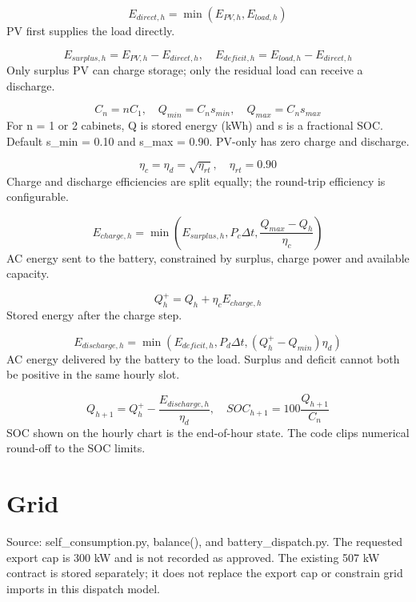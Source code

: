 \documentclass[10pt,a4paper]{article}
\begin{document}
\begin{equation}
E_{direct,h}=\min(E_{PV,h},E_{load,h})
\end{equation}
PV first supplies the load directly.

\begin{equation}
E_{surplus,h}=E_{PV,h}-E_{direct,h},\quad E_{deficit,h}=E_{load,h}-E_{direct,h}
\end{equation}
Only surplus PV can charge storage; only the residual load can receive a discharge.

\begin{equation}
C_n=nC_1,\quad Q_{min}=C_n s_{min},\quad Q_{max}=C_n s_{max}
\end{equation}
For n = 1 or 2 cabinets, Q is stored energy (kWh) and s is a fractional SOC. Default s\_min = 0.10 and s\_max = 0.90. PV-only has zero charge and discharge.

\begin{equation}
\eta_c=\eta_d=\sqrt{\eta_{rt}},\quad \eta_{rt}=0.90
\end{equation}
Charge and discharge efficiencies are split equally; the round-trip efficiency is configurable.

\begin{equation}
E_{charge,h}=\min\left(E_{surplus,h},P_c\Delta t,\frac{Q_{max}-Q_h}{\eta_c}\right)
\end{equation}
AC energy sent to the battery, constrained by surplus, charge power and available capacity.

\begin{equation}
Q_h^+=Q_h+\eta_cE_{charge,h}
\end{equation}
Stored energy after the charge step.

\begin{equation}
E_{discharge,h}=\min\left(E_{deficit,h},P_d\Delta t,(Q_h^+-Q_{min})\eta_d\right)
\end{equation}
AC energy delivered by the battery to the load. Surplus and deficit cannot both be positive in the same hourly slot.

\begin{equation}
Q_{h+1}=Q_h^+-\frac{E_{discharge,h}}{\eta_d},\quad SOC_{h+1}=100\frac{Q_{h+1}}{C_n}
\end{equation}
SOC shown on the hourly chart is the end-of-hour state. The code clips numerical round-off to the SOC limits.

\section{Grid}
Source: self\_consumption.py, balance(), and battery\_dispatch.py. The requested export cap is 300 kW and is not recorded as approved. The existing 507 kW contract is stored separately; it does not replace the export cap or constrain grid imports in this dispatch model.
\end{document}
